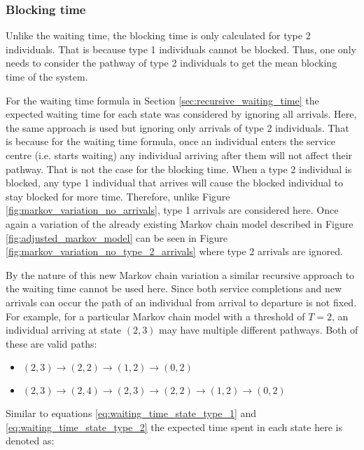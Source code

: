 \subsubsection{Blocking time}

Unlike the waiting time, the blocking time is only calculated for type 2
individuals.
That is because type 1 individuals cannot be blocked.
Thus, one only needs to consider the pathway of type 2 individuals to get the
mean blocking time of the system.

For the waiting time formula in Section \ref{sec:recursive_waiting_time}
the expected waiting time for each state was considered by ignoring all
arrivals.
Here, the same approach is used but ignoring only arrivals of type 2
individuals.
That is because for the waiting time formula, once an individual enters
the service centre (i.e. starts waiting) any individual arriving after them will
not affect their pathway.
That is not the case for the blocking time.
When a type 2 individual is blocked, any type 1 individual that arrives will
cause the blocked individual to stay blocked for more time.
Therefore, unlike Figure \ref{fig:markov_variation_no_arrivals}, type 1 arrivals
are considered here.
Once again a variation of the already existing Markov chain model described in
Figure \ref{fig:adjusted_markov_model} can be seen in Figure
\ref{fig:markov_variation_no_type_2_arrivals} where type 2 arrivals are ignored.



By the nature of this new Markov chain variation a similar recursive approach
to the waiting time cannot be used here.
Since both service completions and new arrivals can occur the path of an
individual from arrival to departure is not fixed.
For example, for a particular Markov chain model with a threshold of \(T=2\),
an individual arriving at state \((2, 3)\) may have multiple different pathways.
Both of these are valid paths:
\begin{itemize}
    \item \((2, 3) \rightarrow (2, 2) \rightarrow (1, 2) \rightarrow (0, 2)\)
    \item \((2, 3) \rightarrow (2, 4) \rightarrow (2, 3) \rightarrow (2, 2)
    \rightarrow (1, 2) \rightarrow (0, 2)\)
\end{itemize}

Similar to equations \ref{eq:waiting_time_state_type_1} and
\ref{eq:waiting_time_state_type_2} the expected time spent in each state here
is denoted as:

